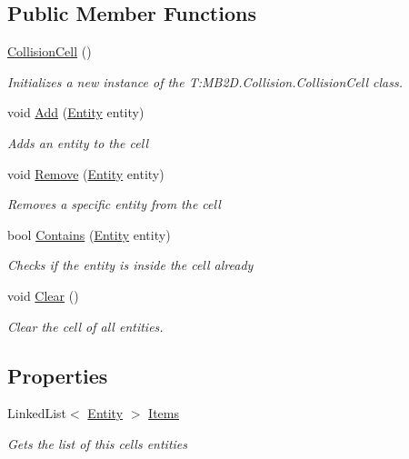 \subsection*{Public Member Functions}
\begin{DoxyCompactItemize}
\item 
\hyperlink{class_m_b2_d_1_1_collision_1_1_collision_cell_a2eefdbb1f60eb35c38c45b4a0f4d939d}{Collision\+Cell} ()
\begin{DoxyCompactList}\small\item\em Initializes a new instance of the T\+:\+M\+B2\+D.\+Collision.\+Collision\+Cell class. \end{DoxyCompactList}\item 
void \hyperlink{class_m_b2_d_1_1_collision_1_1_collision_cell_a4fc338d7dbfd7418f5493424c5937213}{Add} (\hyperlink{class_m_b2_d_1_1_entity_component_1_1_entity}{Entity} entity)
\begin{DoxyCompactList}\small\item\em Adds an entity to the cell \end{DoxyCompactList}\item 
void \hyperlink{class_m_b2_d_1_1_collision_1_1_collision_cell_a064f540f907885b4224119308cbf1761}{Remove} (\hyperlink{class_m_b2_d_1_1_entity_component_1_1_entity}{Entity} entity)
\begin{DoxyCompactList}\small\item\em Removes a specific entity from the cell \end{DoxyCompactList}\item 
bool \hyperlink{class_m_b2_d_1_1_collision_1_1_collision_cell_aa4be244387541ee24d88da80331b3438}{Contains} (\hyperlink{class_m_b2_d_1_1_entity_component_1_1_entity}{Entity} entity)
\begin{DoxyCompactList}\small\item\em Checks if the entity is inside the cell already \end{DoxyCompactList}\item 
void \hyperlink{class_m_b2_d_1_1_collision_1_1_collision_cell_ae4ff144f6c768003d8be46e17e130646}{Clear} ()
\begin{DoxyCompactList}\small\item\em Clear the cell of all entities. \end{DoxyCompactList}\end{DoxyCompactItemize}
\subsection*{Properties}
\begin{DoxyCompactItemize}
\item 
Linked\+List$<$ \hyperlink{class_m_b2_d_1_1_entity_component_1_1_entity}{Entity} $>$ \hyperlink{class_m_b2_d_1_1_collision_1_1_collision_cell_ab893dad8ce4d09c5ab38a5da93145755}{Items}
\begin{DoxyCompactList}\small\item\em Gets the list of this cells entities \end{DoxyCompactList}\end{DoxyCompactItemize}


